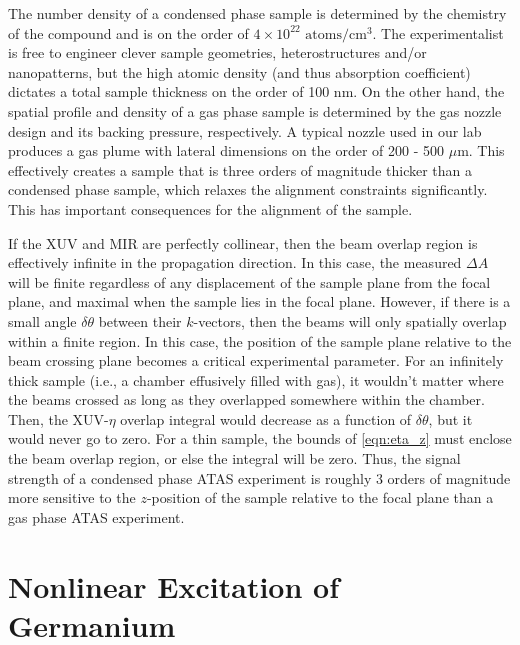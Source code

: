 The number density of a condensed phase sample is determined by the chemistry of the compound and is on the order of $4 \times 10^{22} \text{ atoms}/\text{cm}^3$. The experimentalist is free to engineer clever sample geometries, heterostructures and/or nanopatterns, but the high atomic density (and thus absorption coefficient) dictates a total sample thickness on the order of 100 nm. On the other hand, the spatial profile and density of a gas phase sample is determined by the gas nozzle design and its backing pressure, respectively. A typical nozzle used in our lab produces a gas plume with lateral dimensions on the order of 200 - 500 $\mu$m. This effectively creates a sample that is three orders of magnitude thicker than a condensed phase sample, which relaxes the alignment constraints significantly. This has important consequences for the alignment of the sample.

If the XUV and MIR are perfectly collinear, then the beam overlap region is effectively infinite in the propagation direction. In this case, the measured $\Delta A$ will be finite regardless of any displacement of the sample plane from the focal plane, and maximal when the sample lies in the focal plane. However, if there is a small angle $\delta \theta$ between their $k$-vectors, then the beams will only spatially overlap within a finite region. In this case, the position of the sample plane relative to the beam crossing plane becomes a critical experimental parameter. For an infinitely thick sample (i.e., a chamber effusively filled with gas), it wouldn't matter where the beams crossed as long as they overlapped somewhere within the chamber. Then, the XUV-$\eta$ overlap integral would decrease as a function of $\delta \theta$, but it would never go to zero. For a thin sample, the bounds of \cref{eqn:eta_z} must enclose the beam overlap region, or else the integral will be zero. Thus, the signal strength of a condensed phase ATAS experiment is roughly 3 orders of magnitude more sensitive to the $z$-position of the sample relative to the focal plane than a gas phase ATAS experiment.

\section{Nonlinear Excitation of Germanium}
\label{sec:nonlinear_excitation_germanium}

